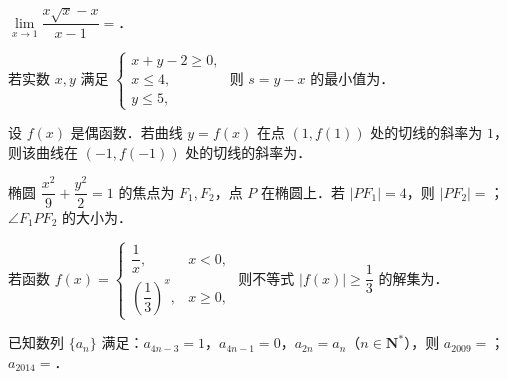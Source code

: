 \begin{question}
$\lim\limits_{x\to1}\dfrac{x\sqrt x-x}{x-1}=$\gkblank{}．

\end{question}
\begin{question}
若实数 $x,y$ 满足 $\begin{cases}x+y-2\geqslant0,\\ x\leqslant4,\\ y\leqslant5,\end{cases}$ 则 $s=y-x$ 的最小值为\gkblank{}．

\end{question}
\begin{question}
设 $f(x)$ 是偶函数．若曲线 $y=f(x)$ 在点 $(1,f(1))$ 处的切线的斜率为 $1$，则该曲线在 $(-1,f(-1))$ 处的切线的斜率为\gkblank{}．

\end{question}
\begin{question}
椭圆 $\dfrac{x^2}{9}+\dfrac{y^2}{2}=1$ 的焦点为 $F_1,F_2$，点 $P$ 在椭圆上．若 $|PF_1|=4$，则 $|PF_2|=$\gkblank{}；$\angle F_1PF_2$ 的大小为\gkblank{}．

\end{question}
\begin{question}
若函数 $f(x)=\begin{cases}\dfrac1x,&x<0,\\[4pt] \left(\dfrac13\right)^x,&x\geqslant0,\end{cases}$ 则不等式 $|f(x)|\geqslant\dfrac13$ 的解集为\gkblank{}．

\end{question}
\begin{question}
已知数列 $\{a_n\}$ 满足：$a_{4n-3}=1$，$a_{4n-1}=0$，$a_{2n}=a_n$（$n\in\mathbf N^*$），则 $a_{2009}=$\gkblank{}；$a_{2014}=$\gkblank{}．

\end{question}

